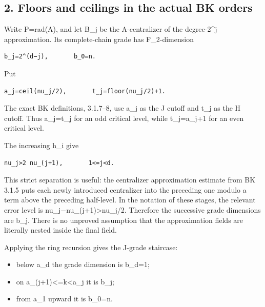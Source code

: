 \hypertarget{dyadic_capacity-floors-and-ceilings-in-the-actual-bk-orders}{%
\subsection{2. Floors and ceilings in the actual BK
orders}\label{dyadic_capacity-floors-and-ceilings-in-the-actual-bk-orders}}

Write P=rad(A), and let B\_j be the A-centralizer of the degree-2\^{}j
approximation. Its complete-chain grade has F\_2-dimension

\begin{Verbatim}[fontsize=\small,breaklines=true,breakanywhere=true]
b_j=2^(d−j),       b_0=n.
\end{Verbatim}

Put

\begin{Verbatim}[fontsize=\small,breaklines=true,breakanywhere=true]
a_j=ceil(nu_j/2),       t_j=floor(nu_j/2)+1.
\end{Verbatim}

The exact BK definitions, 3.1.7--8, use a\_j as the J cutoff and t\_j as
the H cutoff. Thus a\_j=t\_j for an odd critical level, while
t\_j=a\_j+1 for an even critical level.

The increasing h\_i give

\begin{Verbatim}[fontsize=\small,breaklines=true,breakanywhere=true]
nu_j>2 nu_(j+1),       1<=j<d.
\end{Verbatim}

This strict separation is useful: the centralizer approximation estimate
from BK 3.1.5 puts each newly introduced centralizer into the preceding
one modulo a term above the preceding half-level. In the notation of
these stages, the relevant error level is
nu\_j−nu\_(j+1)\textgreater nu\_j/2. Therefore the successive grade dimensions are b\_j. There is no unproved assumption that the
approximation fields are literally nested inside the final field.

Applying the ring recursion gives the J-grade staircase:

\begin{itemize}
\tightlist
\item
  below a\_d the grade dimension is b\_d=1;
\item
  on a\_(j+1)\textless=k\textless a\_j it is b\_j;
\item
  from a\_1 upward it is b\_0=n.
\end{itemize}

